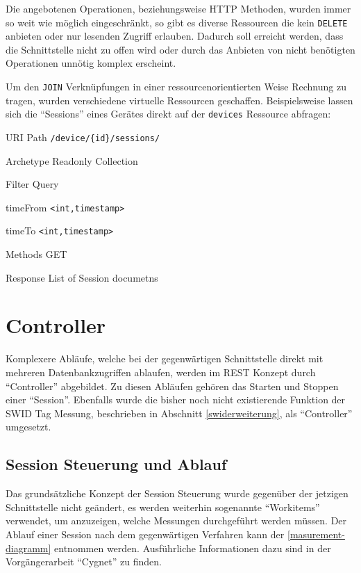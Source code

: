 Die angebotenen Operationen, beziehungsweise HTTP Methoden, wurden immer so weit
wie möglich eingeschränkt, so gibt es diverse Ressourcen die kein
\texttt{DELETE} anbieten oder nur lesenden Zugriff erlauben. Dadurch soll
erreicht werden, dass die Schnittstelle nicht zu offen wird oder durch das
Anbieten von nicht benötigten Operationen unnötig komplex erscheint.

Um den \texttt{JOIN} Verknüpfungen in einer ressourcenorientierten Weise
Rechnung zu tragen, wurden verschiedene virtuelle Ressourcen geschaffen.
Beispielsweise lassen sich die \enquote{Sessions} eines Gerätes direkt auf der
\texttt{devices} Ressource abfragen:

\begin{mdframed}[style=def]
\begin{description*}
	\item[URI Path] \texttt{/device/\{id\}/sessions/}
	\item[Archetype] Readonly Collection
	\item[Filter Query] \hfill
	\begin{description*}
		\item[timeFrom] \texttt{<int,timestamp>}
		\item[timeTo] \texttt{<int,timestamp>}
	\end{description*}	
	\item[Methods] GET
	\item[Response] List of Session documetns
\end{description*}
\end{mdframed}

\section{Controller}
Komplexere Abläufe, welche bei der gegenwärtigen Schnittstelle direkt mit
mehreren Datenbankzugriffen ablaufen, werden im REST Konzept durch
\enquote{Controller} abgebildet. Zu diesen Abläufen gehören das Starten und
Stoppen einer \enquote{Session}. Ebenfalls wurde die bisher noch nicht
existierende Funktion der SWID Tag Messung, beschrieben in Abschnitt
\ref{swiderweiterung}, als \enquote{Controller} umgesetzt.

\subsection{Session Steuerung und Ablauf}
Das grundsätzliche Konzept der Session Steuerung wurde gegenüber der jetzigen
Schnittstelle nicht geändert, es werden weiterhin sogenannte \enquote{Workitems}
verwendet, um anzuzeigen, welche Messungen durchgeführt werden müssen. Der Ablauf
einer Session nach dem gegenwärtigen Verfahren kann der 
\autoref{masurement-diagramm} entnommen werden. Ausführliche
Informationen dazu sind in der Vorgängerarbeit
\enquote{Cygnet}\cite{cygnet:2013} zu finden.

